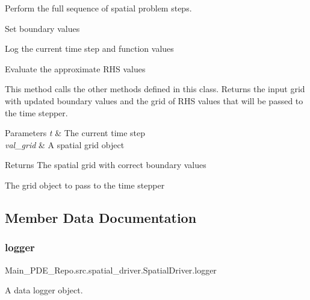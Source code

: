 Perform the full sequence of spatial problem steps. 


\begin{DoxyEnumerate}
\item Set boundary values
\item Log the current time step and function values
\item Evaluate the approximate R\+HS values
\end{DoxyEnumerate}

This method calls the other methods defined in this class. Returns the input grid with updated boundary values and the grid of R\+HS values that will be passed to the time stepper. 
\begin{DoxyParams}{Parameters}
{\em t} & The current time step \\
\hline
{\em val\+\_\+grid} & A spatial grid object \\
\hline
\end{DoxyParams}
\begin{DoxyReturn}{Returns}
The spatial grid with correct boundary values 

The grid object to pass to the time stepper 
\end{DoxyReturn}


\subsection{Member Data Documentation}
\mbox{\label{classMain__PDE__Repo_1_1src_1_1spatial__driver_1_1SpatialDriver_aac2299eb18270b9cc3c17d2d07e0dc57}} 
\subsubsection{\texorpdfstring{logger}{logger}}
{\footnotesize\ttfamily Main\+\_\+\+P\+D\+E\+\_\+\+Repo.\+src.\+spatial\+\_\+driver.\+Spatial\+Driver.\+logger}



A data logger object. 

\mbox{\label{classMain__PDE__Repo_1_1src_1_1spatial__driver_1_1SpatialDriver_a2a61190d268b74c9388d3bbe3e3cce93}} 
